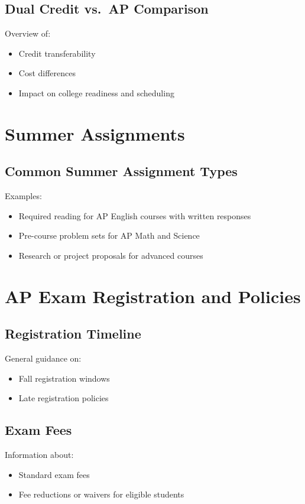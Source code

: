 \documentclass[12pt,oneside]{book}
\begin{document}
\section{Dual Credit vs.\ AP Comparison}
Overview of:
\begin{itemize}[leftmargin=2em]
    \item Credit transferability
    \item Cost differences
    \item Impact on college readiness and scheduling
\end{itemize}

\chapter{Summer Assignments}

\section{Common Summer Assignment Types}
Examples:
\begin{itemize}[leftmargin=2em]
    \item Required reading for AP English courses with written responses
    \item Pre-course problem sets for AP Math and Science
    \item Research or project proposals for advanced courses
\end{itemize}

\chapter{AP Exam Registration and Policies}

\section{Registration Timeline}
General guidance on:
\begin{itemize}[leftmargin=2em]
    \item Fall registration windows
    \item Late registration policies
\end{itemize}

\section{Exam Fees}
Information about:
\begin{itemize}[leftmargin=2em]
    \item Standard exam fees
    \item Fee reductions or waivers for eligible students
\end{itemize}
\end{document}
